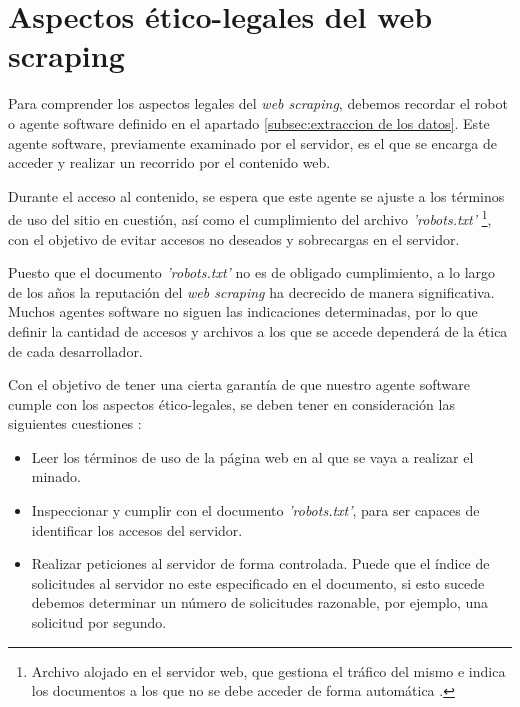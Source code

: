 \section{Aspectos ético-legales del web scraping}
\label{sec:aspectos etico-legales del web scraping}

Para comprender los aspectos legales del \emph{web scraping}, debemos recordar el robot o agente software
definido en el apartado \ref{subsec:extraccion de los datos}. Este agente software, previamente examinado
por el servidor, es el que se encarga de acceder y realizar un recorrido por el contenido web.

Durante el acceso al contenido, se espera que este agente se ajuste a los términos de uso del sitio en
cuestión, así como el cumplimiento del archivo \emph{'robots.txt'} \footnote{Archivo alojado en el
servidor web, que gestiona el tráfico del mismo e indica los documentos a los que no se debe acceder de
forma automática \cite{robots-txt}.}, con el objetivo de evitar accesos no deseados y sobrecargas en el
servidor.

Puesto que el documento \emph{'robots.txt'} no es de obligado cumplimiento, a lo largo de los años la
reputación del \emph{web scraping} ha decrecido de manera significativa. Muchos agentes software no siguen
las indicaciones determinadas, por lo que definir la cantidad de accesos y archivos a los que se accede
dependerá de la ética de cada desarrollador.

Con el objetivo de tener una cierta garantía de que nuestro agente software cumple con los aspectos
ético-legales, se deben tener en consideración las siguientes cuestiones \cite{legalidad-web-scraping}:

\begin{itemize}
    \item Leer los términos de uso de la página web en al que se vaya a realizar el minado.

    \item Inspeccionar y cumplir con el documento \emph{'robots.txt'}, para ser capaces de identificar los 
    accesos del servidor.

    \item Realizar peticiones al servidor de forma controlada. Puede que el índice de solicitudes al 
    servidor no este especificado en el documento, si esto sucede debemos determinar un número de solicitudes 
    razonable, por ejemplo, una solicitud por segundo.
\end{itemize}

















